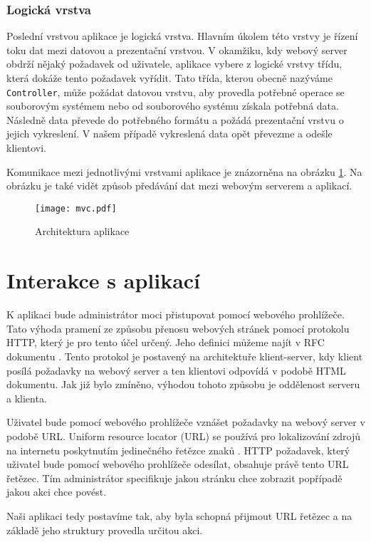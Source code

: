         \subsubsection{Logická vrstva}
        Poslední vrstvou aplikace je logická vrstva. Hlavním úkolem této vrstvy je řízení toku dat mezi datovou a prezentační vrstvou. V okamžiku, kdy webový server obdrží nějaký požadavek od uživatele, aplikace vybere z logické vrstvy třídu, která dokáže tento požadavek vyřídit. Tato třída, kterou obecně nazýváme \verb|Controller|, může požádat datovou vrstvu, aby provedla potřebné operace se souborovým systémem nebo od souborového systému získala potřebná data. Následně data převede do potřebného formátu a požádá prezentační vrstvu o jejich vykreslení. V našem případě vykreslená data opět převezme a odešle klientovi.

        Komunikace mezi jednotlivými vrstvami aplikace je znázorněna na obrázku \ref{mvc}. Na obrázku je také vidět způsob předávání dat mezi webovým serverem a aplikací.

    \begin{figure}[h]
        \centering
        \texttt{[image: mvc.pdf]}
        \caption{Architektura aplikace}
        \label{mvc}
    \end{figure}
\section{Interakce s aplikací}
K aplikaci bude administrátor moci přistupovat pomocí webového prohlížeče. Tato výhoda pramení ze způsobu přenosu webových stránek pomocí protokolu HTTP, který je pro tento účel určený. Jeho definici můžeme najít v RFC dokumentu \cite{RFC2616}. Tento protokol je postavený na architektuře klient-server, kdy klient posílá požadavky na webový server a ten klientovi odpovídá v podobě HTML dokumentu. Jak již bylo zmíněno, výhodou tohoto způsobu je oddělenost serveru a klienta.

Uživatel bude pomocí webového prohlížeče vznášet požadavky na webový server v podobě URL. Uniform resource locator (URL) se používá pro lokalizování zdrojů na internetu poskytnutím jedinečného řetězce znaků \cite{RFC3986}. HTTP požadavek, který uživatel bude pomocí webového prohlížeče odesílat, obsahuje právě tento URL řetězec. Tím administrátor specifikuje jakou stránku chce zobrazit popřípadě jakou akci chce povést.

Naši aplikaci tedy postavíme tak, aby byla schopná přijmout URL řetězec a na základě jeho struktury provedla určitou akci.

